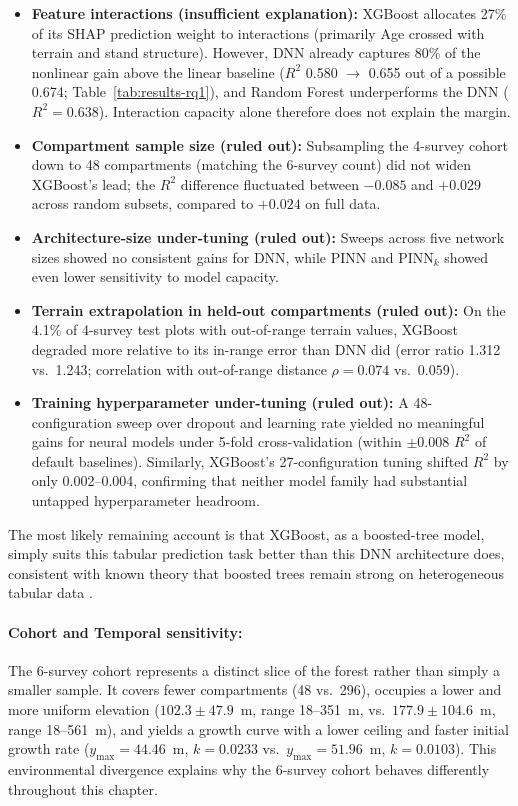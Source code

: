 \documentclass[logo,msc,ai]{infthesis}           %
\begin{document}
\begin{itemize}
\item \textbf{Feature interactions (insufficient explanation):} XGBoost allocates 27\% of its SHAP prediction weight to interactions (primarily Age crossed with terrain and stand structure). However, DNN already captures 80\% of the nonlinear gain above the linear baseline ($R^2$ 0.580 $\to$ 0.655 out of a possible 0.674; Table~\ref{tab:results-rq1}), and Random Forest underperforms the DNN ($R^2 = 0.638$). Interaction capacity alone therefore does not explain the margin.
\item \textbf{Compartment sample size (ruled out):} Subsampling the 4-survey cohort down to 48 compartments (matching the 6-survey count) did not widen XGBoost's lead; the $R^2$ difference fluctuated between $-0.085$ and $+0.029$ across random subsets, compared to $+0.024$ on full data.
\item \textbf{Architecture-size under-tuning (ruled out):} Sweeps across five network sizes showed no consistent gains for DNN, while PINN and PINN$_k$ showed even lower sensitivity to model capacity.
\item \textbf{Terrain extrapolation in held-out compartments (ruled out):} On the 4.1\% of 4-survey test plots with out-of-range terrain values, XGBoost degraded more relative to its in-range error than DNN did (error ratio 1.312 vs.\ 1.243; correlation with out-of-range distance $\rho=0.074$ vs.\ $0.059$).
\item \textbf{Training hyperparameter under-tuning (ruled out):} A 48-configuration sweep over dropout and learning rate yielded no meaningful gains for neural models under 5-fold cross-validation (within $\pm0.008$ $R^2$ of default baselines). Similarly, XGBoost's 27-configuration tuning shifted $R^2$ by only 0.002--0.004, confirming that neither model family had substantial untapped hyperparameter headroom.
\end{itemize}

The most likely remaining account is that XGBoost, as a boosted-tree model, simply suits this tabular prediction task better than this DNN architecture does, consistent with known theory that boosted trees remain strong on heterogeneous tabular data \cite{shwartzziv2021Tabular_C4_NN}.  

\paragraph*{Cohort and Temporal sensitivity:}
The 6-survey cohort represents a distinct slice of the forest rather than simply a smaller sample. It covers fewer compartments (48 vs.\ 296), occupies a lower and more uniform elevation ($102.3\pm47.9$~m, range 18--351~m, vs.\ $177.9\pm104.6$~m, range 18--561~m), and yields a growth curve with a lower ceiling and faster initial growth rate ($y_{\max}=44.46$~m, $k=0.0233$ vs.\ $y_{\max}=51.96$~m, $k=0.0103$). This environmental divergence explains why the 6-survey cohort behaves differently throughout this chapter.
\end{document}
